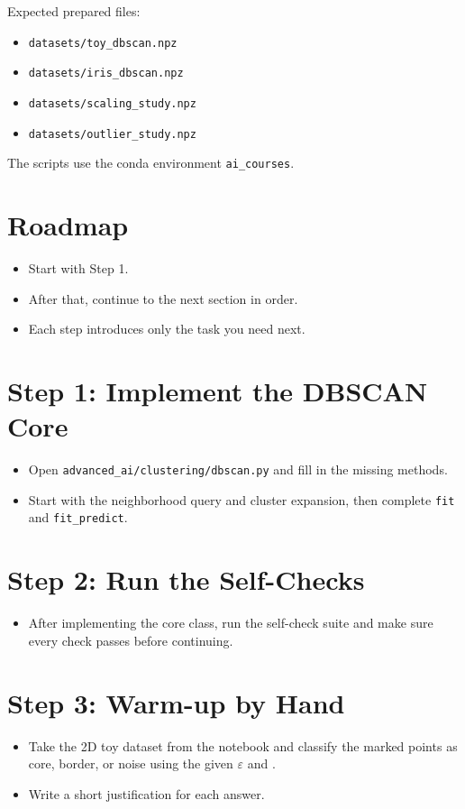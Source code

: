 \medskip
Expected prepared files:
\begin{itemize}
  \item \texttt{datasets/toy\_dbscan.npz}
  \item \texttt{datasets/iris\_dbscan.npz}
  \item \texttt{datasets/scaling\_study.npz}
  \item \texttt{datasets/outlier\_study.npz}
\end{itemize}

\medskip
The scripts use the conda environment \texttt{ai\_courses}.

\section*{Roadmap}
\begin{itemize}
  \item Start with Step 1.
  \item After that, continue to the next section in order.
  \item Each step introduces only the task you need next.
\end{itemize}

\section*{Step 1: Implement the DBSCAN Core}
\begin{itemize}
  \item Open \texttt{advanced\_ai/clustering/dbscan.py} and fill in the missing methods.
  \item Start with the neighborhood query and cluster expansion, then complete \texttt{fit} and \texttt{fit\_predict}.
\end{itemize}

\section*{Step 2: Run the Self-Checks}
\begin{itemize}
  \item After implementing the core class, run the self-check suite and make sure every check passes before continuing.
\end{itemize}

\section*{Step 3: Warm-up by Hand}
\begin{itemize}
  \item Take the 2D toy dataset from the notebook and classify the marked points as core, border, or noise using the given $\varepsilon$ and .
  \item Write a short justification for each answer.
\end{itemize}

